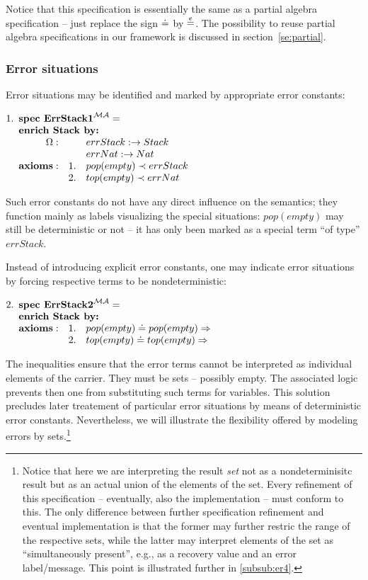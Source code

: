 \documentclass[10pt]{article}
\begin{document}
Notice
that this  specification is essentially the same as a partial
algebra specification -- just replace the sign $\mathrel{\dot{=} }$ by $\stackrel{e}{=}$. The
possibility to reuse partial algebra specifications in our framework is
discussed in section~\ref{se:partial}.

\subsubsection{Error situations}\label{subsub:er2}
Error situations may be identified and marked by appropriate error constants:
\vspace*{1ex}

\(
1. \spec{	\tit{\mbox{\bf spec\ ErrStack1}^{\inst{MA}}=} \\
	\tit{\mbox{\bf enrich\ Stack\  by:}} \\
	    	\Ops:	&& errStack: \to Stack\\
		        && errNat: \to Nat \\
	 	{\bf axioms:}
			&1.& pop(empty) \prec errStack\\
			&2.& top(empty) \prec errNat
}
\) 

\noindent
Such error constants do not have any
direct influence on the semantics; they function mainly as labels visualizing
the special situations:
$pop(empty)$ may still be deterministic or not -- it has only been marked as a
special term ``of type'' $errStack$. 

Instead of introducing explicit error constants, one may indicate error
situations by forcing respective terms to be nondeterministic:
\vspace*{1ex}

\(
2. \spec{	\tit{\mbox{\bf spec\ ErrStack2}^{\inst{MA}}=} \\
	\tit{\mbox{\bf enrich\ Stack\  by:}} \\
	 	{\bf axioms:}
			&1.& pop(empty) \eleq pop(empty) \To\\
			&2.& top(empty) \eleq top(empty) \To
}
\)  

\noindent
The inequalities ensure that the error terms cannot be interpreted as
individual elements of the carrier. They must be sets -- possibly empty. The
associated logic prevents then one from substituting such terms for
variables. This solution precludes later treatement of particular error
situations by means of deterministic error constants.  Nevertheless, we will
illustrate the flexibility offered by modeling errors by
sets.\footnote{Notice that here we are interpreting the result {\em set} not
as a nondeterminisitc result but as an actual union of the elements of the
set. Every refinement of this specification -- eventually, also the
implementation -- must conform to this. The only difference between further
specification refinement and eventual implementation is that the former may
further restric the range of the respective sets, while the latter may
interpret elements of the set as ``simultaneously present'', e.g., as a
recovery value and an error label/message. This point is illustrated further
in \ref{subsub:er4}.}
\end{document}
